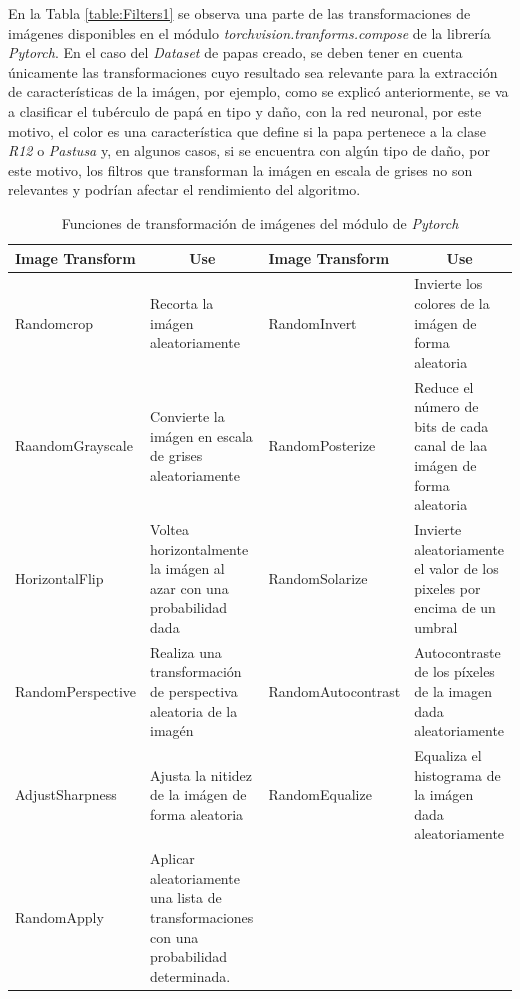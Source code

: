 En la Tabla \ref{table:Filters1} se observa una parte de las transformaciones de imágenes disponibles en el módulo \textit{torchvision.tranforms.compose} de la librería \textit{Pytorch}. En el caso del \textit{Dataset} de papas creado, se deben tener en cuenta únicamente las transformaciones cuyo resultado sea relevante para la extracción de características de la imágen, por ejemplo, como se explicó anteriormente, se va a clasificar el tubérculo de papá en tipo y daño, con la red neuronal, por este motivo, el color es una característica que define si la papa pertenece a la clase \textit{R12} o \textit{Pastusa} y, en algunos casos, si se encuentra con algún tipo de daño, por este motivo, los filtros que transforman la imágen en escala de grises no son relevantes y podrían afectar el rendimiento del algoritmo.

\begin{table}[ht]
	\centering
	\begin{tabular}{|p{3.5cm}|p{3.5cm}|p{3.8cm}|p{3.5cm}|}
		\hline
		Image Transform       & \multicolumn{1}{c|}{Use}                                                               & Image Transform       & \multicolumn{1}{c|}{Use}                                                \\ \hline
		Randomcrop            & Recorta la imágen aleatoriamente                                                       & RandomInvert          & Invierte los colores de la imágen de forma aleatoria                    \\ \hline
		RaandomGrayscale      & Convierte la imágen en escala de grises aleatoriamente                                 & RandomPosterize       & Reduce el número de bits de cada canal de laa imágen de forma aleatoria \\ \hline
		HorizontalFlip  & Voltea horizontalmente la imágen al azar con una probabilidad dada                     & RandomSolarize        & Invierte aleatoriamente el valor de los pixeles por encima de un umbral \\ \hline
		RandomPerspective     & Realiza una transformación de perspectiva aleatoria de la imagén                       & RandomAutocontrast    & Autocontraste de los píxeles de la imagen dada aleatoriamente           \\ \hline
		AdjustSharpness & Ajusta la nitidez de la imágen de forma aleatoria                                      & RandomEqualize        & Equaliza el histograma de la imágen dada aleatoriamente                 \\ \hline
		RandomApply           & Aplicar aleatoriamente una lista de transformaciones con una probabilidad determinada. & \multicolumn{1}{l|}{} &                                                                         \\ \hline
	\end{tabular}				
	\caption{Funciones de transformación de imágenes del módulo de \textit{Pytorch}}
	\label{table:filters2}
\end{table}

